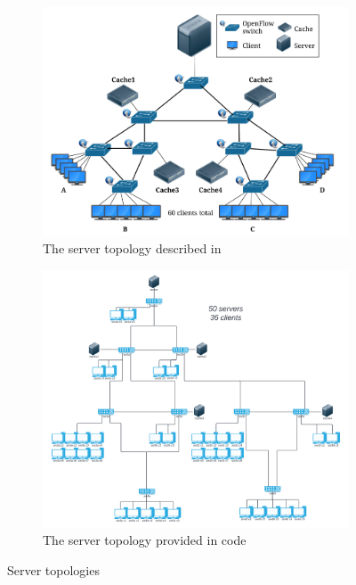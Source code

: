 \documentclass{article}
\begin{document}
\begin{figure}[!tbp]
  \begin{subfigure}[b]{0.45\textwidth}
    \includegraphics[width=\textwidth]{images/sabr_og_topo.png}
    \caption{The server topology described in \cite{bhat_network_2017}}
    \label{fig:sabr_og_topo}
  \end{subfigure}
  \hfill
  \begin{subfigure}[b]{0.45\textwidth}
    \includegraphics[width=\textwidth]{images/SABR_code_og.png}
    \caption{The server topology provided in code}
    \label{fig:sabr_code_og}
  \end{subfigure}
  \caption{Server topologies}
  \label{fig:server}
\end{figure}
\end{document}
